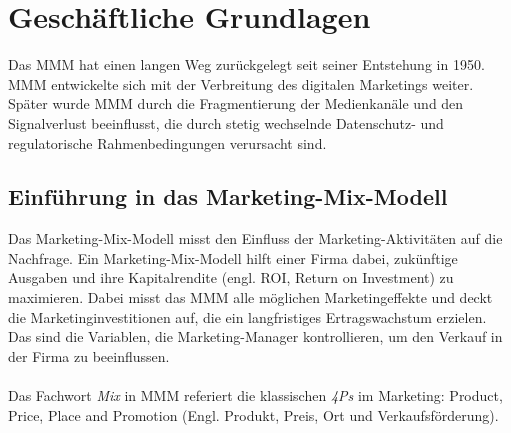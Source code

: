 \newpage
\section{Geschäftliche Grundlagen}
\label{GeschäftlicheGrundlagen}
Das \ac{MMM} hat einen langen Weg zurückgelegt seit seiner Entstehung in 1950. \ac{MMM} entwickelte sich mit der Verbreitung des digitalen Marketings weiter. Später wurde \ac{MMM} durch die Fragmentierung der Medienkanäle und den Signalverlust beeinflusst, die durch stetig wechselnde Datenschutz- und regulatorische Rahmenbedingungen verursacht sind\cite{MMMdef}.
\subsection{Einführung in das Marketing-Mix-Modell}
\label{EinführungInDasMMM}
Das Marketing-Mix-Modell misst den Einfluss der Marketing-Aktivitäten auf die Nachfrage. Ein Marketing-Mix-Modell hilft einer Firma dabei, zukünftige Ausgaben und ihre Kapitalrendite (engl. \ac{ROI}, Return on Investment) zu maximieren. Dabei misst das \ac{MMM} alle möglichen Marketingeffekte und deckt die Marketinginvestitionen auf, die ein langfristiges Ertragswachstum erzielen. Das sind die Variablen, die Marketing-Manager kontrollieren, um den Verkauf in der Firma zu beeinflussen. \\\\Das Fachwort \textit{Mix} in \ac{MMM} referiert die klassischen \textit{4Ps} im Marketing: Product, Price, Place and Promotion (Engl. Produkt, Preis, Ort und Verkaufsförderung)\cite[S. 109 ff]{akinkunmi2018data}. \\\\
